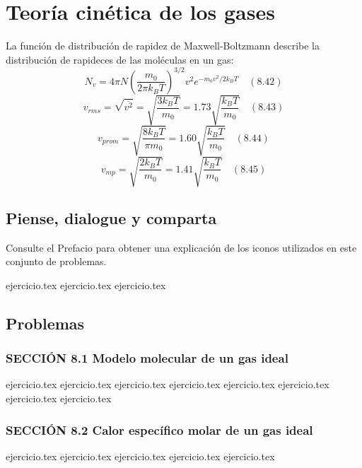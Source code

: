\chapter{Teoría cinética de los gases}
\label{cap:teoria_cinetica}

La función de distribución de rapidez de Maxwell-Boltzmann describe la distribución de rapideces de las moléculas en un gas:
$$ N_v = 4\pi N \left( \frac{m_0}{2\pi k_B T} \right)^{3/2} v^2 e^{-m_0 v^2 / 2k_B T} \quad (8.42) $$
$$ v_{rms} = \sqrt{\overline{v^2}} = \sqrt{\frac{3k_B T}{m_0}} = 1.73 \sqrt{\frac{k_B T}{m_0}} \quad (8.43) $$
$$ v_{prom} = \sqrt{\frac{8k_B T}{\pi m_0}} = 1.60 \sqrt{\frac{k_B T}{m_0}} \quad (8.44) $$
$$ v_{mp} = \sqrt{\frac{2k_B T}{m_0}} = 1.41 \sqrt{\frac{k_B T}{m_0}} \quad (8.45) $$

\section*{Piense, dialogue y comparta}
Consulte el Prefacio para obtener una explicación de los iconos utilizados en este conjunto de problemas.

\begin{enumerate}
    {ejercicio.tex}
    {ejercicio.tex}
    {ejercicio.tex}
\end{enumerate}

\section*{Problemas}

\subsection*{SECCIÓN 8.1 Modelo molecular de un gas ideal}
\begin{enumerate}
    {ejercicio.tex}
    {ejercicio.tex}
    {ejercicio.tex}
    {ejercicio.tex}
    {ejercicio.tex}
    {ejercicio.tex}
    {ejercicio.tex}
    {ejercicio.tex}
\end{enumerate}

\subsection*{SECCIÓN 8.2 Calor específico molar de un gas ideal}
\begin{enumerate}
    \setcounter{enumi}{8}
    {ejercicio.tex}
    {ejercicio.tex}
    {ejercicio.tex}
    {ejercicio.tex}
    {ejercicio.tex}
\end{enumerate}


